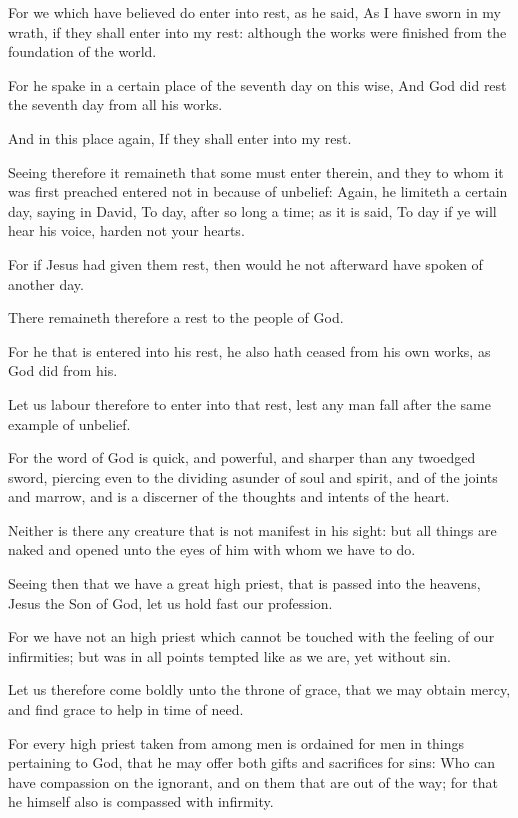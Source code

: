 \Verse For we which have believed do enter into rest, as he said, As I have sworn in my wrath, if they shall enter into my rest: although the works were finished from the foundation of the world.

\Verse For he spake in a certain place of the seventh day on this wise, And God did rest the seventh day from all his works.

\Verse And in this place again, If they shall enter into my rest.

\Verse Seeing therefore it remaineth that some must enter therein, and they to whom it was first preached entered not in because of unbelief: \Verse Again, he limiteth a certain day, saying in David, To day, after so long a time; as it is said, To day if ye will hear his voice, harden not your hearts.

\Verse For if Jesus had given them rest, then would he not afterward have spoken of another day.

\Verse There remaineth therefore a rest to the people of God.

\Verse For he that is entered into his rest, he also hath ceased from his own works, as God did from his.

\Verse Let us labour therefore to enter into that rest, lest any man fall after the same example of unbelief.

\Verse For the word of God is quick, and powerful, and sharper than any twoedged sword, piercing even to the dividing asunder of soul and spirit, and of the joints and marrow, and is a discerner of the thoughts and intents of the heart.

\Verse Neither is there any creature that is not manifest in his sight: but all things are naked and opened unto the eyes of him with whom we have to do.

\Verse Seeing then that we have a great high priest, that is passed into the heavens, Jesus the Son of God, let us hold fast our profession.

\Verse For we have not an high priest which cannot be touched with the feeling of our infirmities; but was in all points tempted like as we are, yet without sin.

\Verse Let us therefore come boldly unto the throne of grace, that we may obtain mercy, and find grace to help in time of need.


\Chapter
\Verse For every high priest taken from among men is ordained for men in things pertaining to God, that he may offer both gifts and sacrifices for sins: \Verse Who can have compassion on the ignorant, and on them that are out of the way; for that he himself also is compassed with infirmity.


